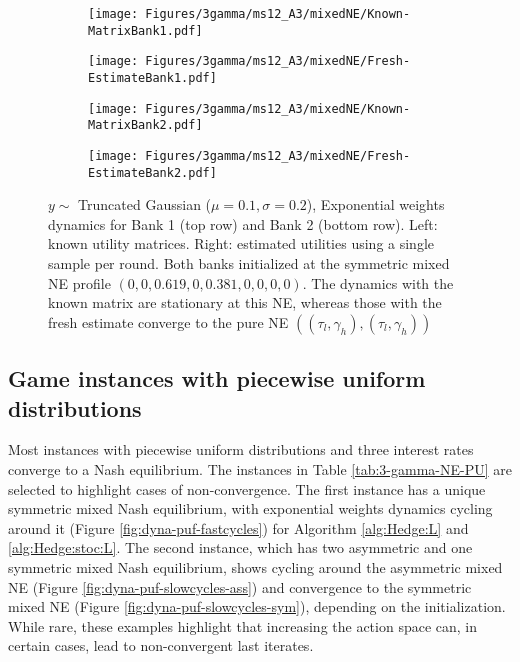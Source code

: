 \begin{figure}[H]
    \centering
    \begin{subfigure}{0.49\linewidth}
        \centering
        \texttt{[image: Figures/3gamma/ms12\_A3/mixedNE/Known-MatrixBank1.pdf]}
    \end{subfigure}
    \begin{subfigure}{0.49\linewidth}
        \centering
        \texttt{[image: Figures/3gamma/ms12\_A3/mixedNE/Fresh-EstimateBank1.pdf]}
    \end{subfigure}
    \begin{subfigure}{0.49\linewidth}
        \centering
        \texttt{[image: Figures/3gamma/ms12\_A3/mixedNE/Known-MatrixBank2.pdf]}
    \end{subfigure}
    \begin{subfigure}{0.49\linewidth}
        \centering
        \texttt{[image: Figures/3gamma/ms12\_A3/mixedNE/Fresh-EstimateBank2.pdf]}
    \end{subfigure}
    \caption{$y \sim$ Truncated Gaussian ($\mu=0.1, \sigma=0.2$), Exponential weights dynamics for Bank 1 (top row) and Bank 2 (bottom row). Left: known utility matrices. Right: estimated utilities using a single sample per round. Both banks initialized at the symmetric mixed NE profile $(0, 0, 0.619, 0, 0.381, 0, 0, 0, 0)$. The dynamics with the known matrix are stationary at this NE, whereas those with the fresh estimate converge to the pure NE $((\tau_l, \gamma_h),(\tau_l, \gamma_h))$ \label{fig:dyna-A3-mixed}} 
\end{figure}

\subsection{Game instances with piecewise uniform distributions}
\label{app:3-gamma-puf}
Most instances with piecewise uniform distributions and three interest rates converge to a Nash equilibrium. The instances in Table \ref{tab:3-gamma-NE-PU} are selected to highlight cases of non-convergence. The first instance has a unique symmetric mixed Nash equilibrium, with exponential weights dynamics cycling around it (Figure \ref{fig:dyna-puf-fastcycles}) for Algorithm \ref{alg:Hedge:L} and \ref{alg:Hedge:stoc:L}. The second instance, which has two asymmetric and one symmetric mixed Nash equilibrium, shows cycling around the asymmetric mixed NE (Figure \ref{fig:dyna-puf-slowcycles-ass}) and convergence to the symmetric mixed NE (Figure \ref{fig:dyna-puf-slowcycles-sym}), depending on the initialization. While rare, these examples highlight that increasing the action space can, in certain cases, lead to non-convergent last iterates.

